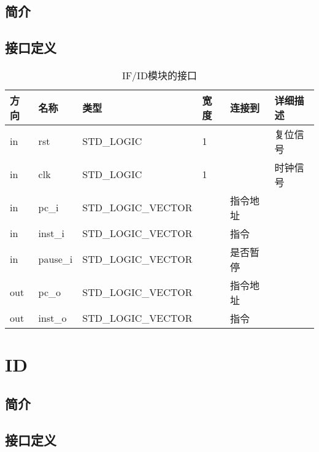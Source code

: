 \documentclass{article}
\begin{document}
\subsection{简介}

\FloatBarrier
\subsection{接口定义}

\begin{table}
    \centering
    \small
    \begin{tabular}{lllllp{2cm}}
    \toprule
    方向 & 名称 & 类型 & 宽度 & 连接到 & 详细描述 \\ \midrule
    in & rst\label{IF/ID:rst} & STD_LOGIC & 1 & \nameref{sec:MIPS_CPU} & 复位信号 \\
    in & clk\label{IF/ID:clk} & STD_LOGIC & 1 & \nameref{sec:MIPS_CPU} & 时钟信号 \\
    in & pc_i\label{IF/ID:pc_i} & STD_LOGIC_VECTOR & \nameref{const:INST_ADDR_LEN} & 指令地址 \\
    in & inst_i\label{IF/ID:inst_i} & STD_LOGIC_VECTOR & \nameref{const:INST_LEN} & 指令 \\
    in & pause_i\label{IF/ID:pause_i} & STD_LOGIC_VECTOR & \nameref{const:CTRL_PAUSE_LEN} & 是否暂停 \\
    out & pc_o\label{IF/ID:pc_o} & STD_LOGIC_VECTOR & \nameref{const:INST_ADDR_LEN} & 指令地址 \\
    out & inst_o\label{IF/ID:inst_o} & STD_LOGIC_VECTOR & \nameref{const:INST_LEN} & 指令 \\
    \bottomrule
    \end{tabular}
    \caption {IF/ID模块的接口}
\end{table}
\FloatBarrier

\section{ID}
\label{sec:ID}

\subsection{简介}

\FloatBarrier
\subsection{接口定义}
\end{document}
